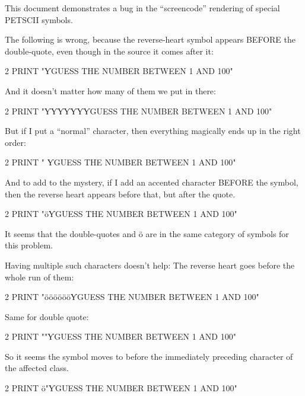 

This document demonstrates a bug in the ``screencode'' rendering of special PETSCII symbols.

The following is wrong, because the reverse-heart symbol appears BEFORE
the double-quote, even though in the source it comes after it:
\begin{screencode}
2 PRINT "ƳGUESS THE NUMBER BETWEEN 1 AND 100"
\end{screencode}

And it doesn't matter how many of them we put in there:
\begin{screencode}
2 PRINT "ƳƳƳƳƳƳƳGUESS THE NUMBER BETWEEN 1 AND 100"
\end{screencode}

But if I put a ``normal'' character, then everything magically ends up in the right order:

\begin{screencode}
2 PRINT " ƳGUESS THE NUMBER BETWEEN 1 AND 100"
\end{screencode}

And to add to the mystery, if I add an accented character BEFORE the symbol, then the reverse
heart appears before that, but after the quote.

\begin{screencode}
2 PRINT "öƳGUESS THE NUMBER BETWEEN 1 AND 100"
\end{screencode}

It seems that the double-quotes and ö are in the same category of symbols for this problem.

Having multiple such characters doesn't help: The reverse heart goes before the whole run
of them:

\begin{screencode}
2 PRINT "ööööööƳGUESS THE NUMBER BETWEEN 1 AND 100"
\end{screencode}

Same for double quote:

\begin{screencode}
2 PRINT ""ƳGUESS THE NUMBER BETWEEN 1 AND 100"
\end{screencode}

So it seems the symbol moves to before the immediately preceding character of the affected class.

\begin{screencode}
2 PRINT ö"ƳGUESS THE NUMBER BETWEEN 1 AND 100"
\end{screencode}



